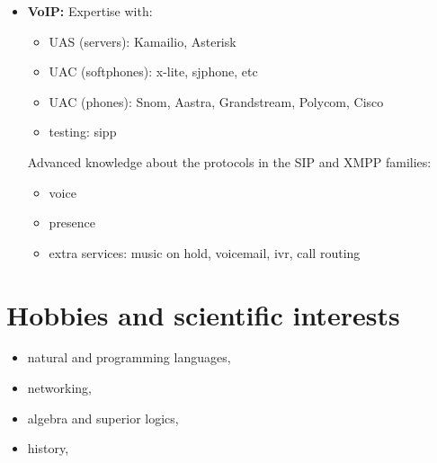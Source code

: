 \begin{itemize}
		\item \textbf{VoIP:}
			Expertise with:
			\begin{itemize}
				\item UAS (servers): Kamailio, Asterisk
				\item UAC (softphones): x-lite, sjphone, etc
				\item UAC (phones): Snom, Aastra, Grandstream, Polycom, Cisco
				\item testing: sipp 
			\end{itemize}

			Advanced knowledge about the protocols in the SIP and XMPP families:
			\begin{itemize}
				\item voice
				\item presence
				\item extra services: music on hold, voicemail, ivr, call routing  
			\end{itemize}			

	\end{itemize}
\section{Hobbies and scientific interests}
	\begin{itemize}
		\item natural and programming languages,
		\item networking,
		\item algebra and superior logics,
		\item history, 
	\end{itemize}
          
